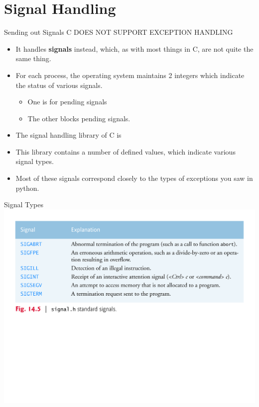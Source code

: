 \documentclass[11pt]{beamer}
\let\OldTexttt\texttt
\renewcommand{\texttt}[1]{\OldTexttt{\color{teal}{#1}}}
\begin{document}
\section[signals]{Signal Handling}
\begin{frame}{Sending out Signals}
\center
\large{C DOES NOT SUPPORT EXCEPTION HANDLING}
\flushleft
\begin{itemize}
\item It handles \textbf{signals} instead, which, as with most things in C, are not quite the same thing.
\item For each process, the operating system maintains 2 integers which indicate the status of various signals.
\begin{itemize}
\item One is for pending signals
\item The other blocks pending signals.
\end{itemize}
\item The signal handling library of C is \texttt{<signal.h>}
\item This library contains a number of defined values, which indicate various signal types.  
\item Most of these signals correspond closely to the types of exceptions you saw in python.
\end{itemize}
\end{frame}

\begin{frame}{Signal Types}
\center
\includegraphics[scale=0.35]{signals.png}
\end{frame}
\end{document}
